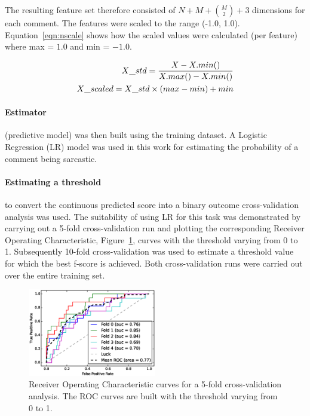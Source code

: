 \documentclass[a4paper,10pt]{article}
\begin{document}
The resulting feature set therefore consisted of $N + M + {{M}\choose{2}} + 3$ 
dimensions for each comment. The features were scaled to the range (-1.0, 1.0). 
Equation~\ref{eqn:nscale} shows how the scaled values were calculated (per 
feature) where max = $1.0$ and min = $-1.0$. 

\begin{equation} \label{eqn:nscale}
\begin{split}
X\_std = {{X - X.min()} \over {X.max() - X.min()}} \\
X\_scaled = X\_std \times (max - min) + min 
\end{split}
\end{equation}

\paragraph{Estimator} (predictive model) was then built using the training 
dataset. A Logistic Regression (LR) model was used in this work for estimating 
the probability of a comment being sarcastic.

\paragraph{Estimating a threshold} to convert the continuous predicted score 
into a binary outcome cross-validation analysis was used. The suitability of 
using LR for this task was demonstrated by carrying out a 5-fold 
cross-validation run and plotting the corresponding Receiver Operating 
Characteristic, Figure~\ref{fig:roc}, curves with the threshold varying from 0 
to 1. Subsequently 10-fold cross-validation was used to estimate a threshold 
value for which the best f-score is achieved. Both cross-validation runs were 
carried out over the entire training set.

\begin{figure}[!h]
  \centering
  \includegraphics[width=0.5\textwidth]{roc.eps}
  \caption{Receiver Operating Characteristic curves for a 5-fold 
cross-validation analysis. The ROC curves are built with the threshold varying 
from 0 to 1.}
  \label{fig:roc} 
\end{figure}
\end{document}
